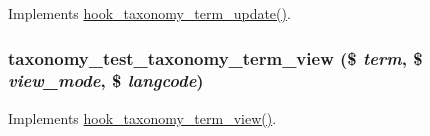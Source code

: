 \label{taxonomy__test_8module_ae18572695343ab33f33ef409e2301128}
Implements \hyperlink{group__hooks_ga5c2477516245f0b9d6b04b8a8d227592}{hook\_\-taxonomy\_\-term\_\-update()}. \hypertarget{taxonomy__test_8module_a5bc2b372d22578c4741c2dc9aa0976bb}{
\subsubsection[{taxonomy\_\-test\_\-taxonomy\_\-term\_\-view}]{\setlength{\rightskip}{0pt plus 5cm}taxonomy\_\-test\_\-taxonomy\_\-term\_\-view (\$ {\em term}, \/  \$ {\em view\_\-mode}, \/  \$ {\em langcode})}}
\label{taxonomy__test_8module_a5bc2b372d22578c4741c2dc9aa0976bb}
Implements \hyperlink{group__hooks_gaeb73cbcc621835fb8f1d9114b3234bd5}{hook\_\-taxonomy\_\-term\_\-view()}. 